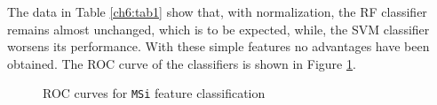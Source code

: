 The data in Table \ref{ch6:tab1} show that, with normalization, the \Gls{RF} classifier remains almost unchanged, which is to be expected, while, the \Gls{SVM} classifier
worsens its performance. With these simple features no advantages have been obtained. The \Gls{ROC} curve of the classifiers is shown in Figure \ref{ch6:fig1}.


\begin{figure}[!htb]
  \centering
    \hspace{1mm}
    \caption{ROC curves for \texttt{MSi} feature classification}
    \label{ch6:fig1}
\end{figure}

